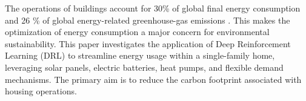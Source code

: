 The operations of buildings account for 30\% of global final energy consumption and 26 \% of global energy-related greenhouse-gas emissions \cite{IEA.06.01.2024}. This makes the optimization of energy consumption a major concern for environmental sustainability. This paper investigates the application of Deep Reinforcement Learning (DRL) to streamline energy usage within a single-family home, leveraging solar panels, electric batteries, heat pumps, and flexible demand mechanisms. The primary aim is to reduce the carbon footprint associated with housing operations.